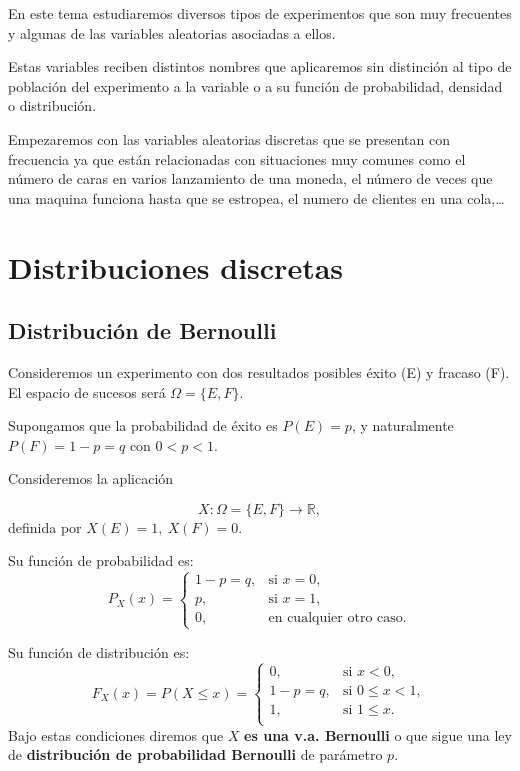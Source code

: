 \documentclass[]{book}
\begin{document}
En este tema estudiaremos diversos tipos de experimentos que son muy frecuentes y algunas de las variables aleatorias asociadas a ellos.

Estas variables reciben distintos nombres que aplicaremos sin distinción al tipo de población del experimento a la variable o a su función de probabilidad, densidad o distribución.

Empezaremos con las variables aleatorias discretas que se presentan con frecuencia ya que están relacionadas con situaciones muy comunes como el número de caras en varios lanzamiento de una moneda, el número de veces que una maquina funciona hasta que se estropea, el numero de clientes en una cola,\ldots{}

\hypertarget{distribuciones-discretas}{%
\section{Distribuciones discretas}\label{distribuciones-discretas}}

\hypertarget{distribuciuxf3n-de-bernoulli}{%
\subsection{Distribución de Bernoulli}\label{distribuciuxf3n-de-bernoulli}}

Consideremos un experimento con dos resultados posibles éxito (E) y
fracaso (F). El espacio de sucesos será \(\Omega=\{E,F\}\).

Supongamos que la probabilidad de éxito es \(P(E)=p\), y naturalmente \(P(F)=1-p=q\) con \(0<p<1\).

Consideremos la aplicación

\[
X:\Omega=\{E,F\}\to \mathbb{R},
\]
definida por \(X(E)=1,\ X(F)=0.\)

Su función de probabilidad es:
\[
P_{X}(x)=
\left\{
\begin{array}{ll} 1-p=q, & \mbox{si } x=0,\\
p, & \mbox{si } x=1,\\
0, & \mbox{en cualquier otro caso.}
\end{array}
\right.
\]

Su función de distribución es:
\[
F_{X}(x)=P(X\leq x)=
\left\{
\begin{array}{ll} 
0, & \mbox{si } x<0,\\
1-p=q, & \mbox{si } 0\leq x <1,\\
1, & \mbox{si } 1\leq x. \\
\end{array}
\right.
\]
Bajo estas condiciones diremos que \(X\) \textbf{es una v.a. Bernoulli} o que sigue una ley de \textbf{distribución de probabilidad Bernoulli} de parámetro \(p\).
\end{document}
